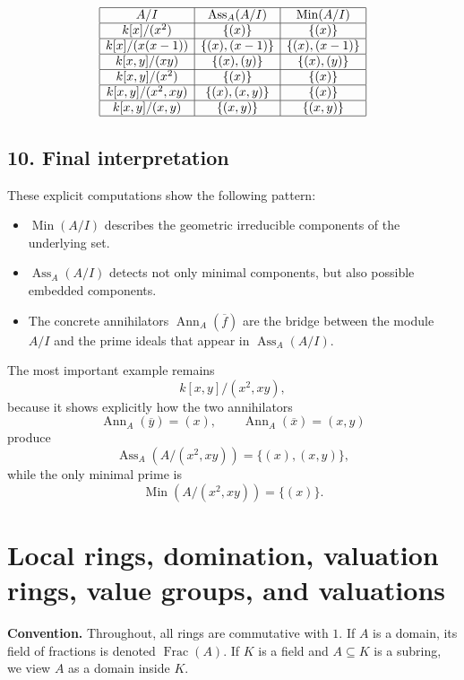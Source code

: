 \documentclass[12pt,a4paper]{article}
\theoremstyle{notespace}
\DeclareMathOperator{\Ass}{Ass}
\DeclareMathOperator{\Ann}{Ann}
\DeclareMathOperator{\Min}{Min}
\DeclareMathOperator{\Frac}{Frac}
\begin{document}
\[
\begin{array}{|c|c|c|}
	\hline
	A/I & \Ass_A(A/I) & \Min(A/I) \\
	\hline
	k[x]/(x^2) & \{(x)\} & \{(x)\} \\
	\hline
	k[x]/(x(x-1)) & \{(x),(x-1)\} & \{(x),(x-1)\} \\
	\hline
	k[x,y]/(xy) & \{(x),(y)\} & \{(x),(y)\} \\
	\hline
	k[x,y]/(x^2) & \{(x)\} & \{(x)\} \\
	\hline
	k[x,y]/(x^2,xy) & \{(x),(x,y)\} & \{(x)\} \\
	\hline
	k[x,y]/(x,y) & \{(x,y)\} & \{(x,y)\} \\
	\hline
\end{array}
\]

\subsection{10. Final interpretation}

These explicit computations show the following pattern:

\begin{itemize}
	\item \(\Min(A/I)\) describes the geometric irreducible components of the underlying set.
	\item \(\Ass_A(A/I)\) detects not only minimal components, but also possible embedded components.
	\item The concrete annihilators \(\Ann_A(\overline f)\) are the bridge between the module \(A/I\) and the prime ideals that appear in \(\Ass_A(A/I)\).
\end{itemize}

The most important example remains
\[
k[x,y]/(x^2,xy),
\]
because it shows explicitly how the two annihilators
\[
\Ann_A(\overline y)=(x),
\qquad
\Ann_A(\overline x)=(x,y)
\]
produce
\[
\Ass_A(A/(x^2,xy))=\{(x),(x,y)\},
\]
while the only minimal prime is
\[
\Min(A/(x^2,xy))=\{(x)\}.
\]

\section{Local rings, domination, valuation rings, value groups, and valuations}

\textbf{Convention.}
Throughout, all rings are commutative with \(1\). If \(A\) is a domain, its field of fractions is denoted \(\Frac(A)\). If \(K\) is a field and \(A\subseteq K\) is a subring, we view \(A\) as a domain inside \(K\).
\end{document}
